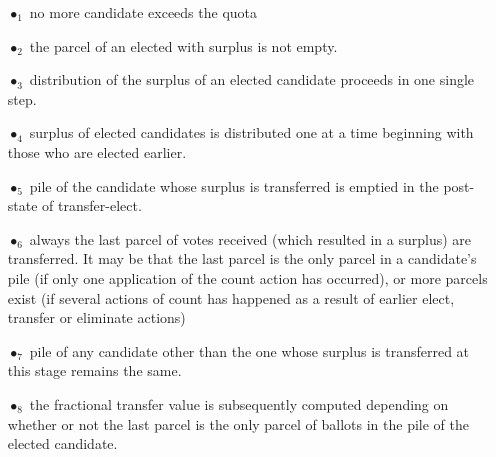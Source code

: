 \documentclass[10pt,conference]{IEEEtran}
\begin{document}
\begin{itemize}
\item[$\bullet_{1}$] no more candidate exceeds the quota
\item[$\bullet_{2}$] the  parcel of an elected with surplus is not empty.
\item[$\bullet_{3}$] distribution of the surplus of an elected candidate proceeds in one single step.
\item[$\bullet_{4}$] surplus of elected candidates is distributed one at a time beginning with those who are elected earlier. 
\item[$\bullet_{5}$] pile of the candidate whose surplus is transferred is emptied in the post-state of transfer-elect.
\item[$\bullet_{6}$] always the last parcel of votes  received (which resulted in a surplus) are transferred. It may be that the last parcel is the only parcel in a candidate's pile (if only one application of the count action has occurred), or more parcels exist (if several actions of count has happened as a result of earlier  elect, transfer or eliminate actions)
\item[$\bullet_{7}$] pile of any candidate other than the one whose surplus is transferred at this stage remains the same.
\item[$\bullet_{8}$] the fractional transfer value is subsequently computed depending on whether or not the last parcel is the only parcel of ballots in the pile of the elected candidate. 
\end{itemize}
\end{document}
